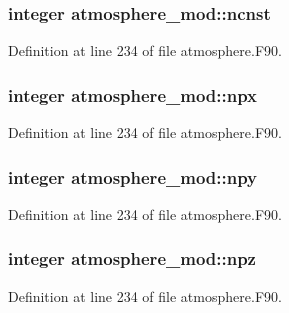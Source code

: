 \subsubsection[{ncnst}]{\setlength{\rightskip}{0pt plus 5cm}integer atmosphere\-\_\-mod\-::ncnst\hspace{0.3cm}{\ttfamily [private]}}\label{classatmosphere__mod_a9a8c995d33f2c1869ae7d0b49d5e1002}


Definition at line 234 of file atmosphere.\-F90.

\subsubsection[{npx}]{\setlength{\rightskip}{0pt plus 5cm}integer atmosphere\-\_\-mod\-::npx\hspace{0.3cm}{\ttfamily [private]}}\label{classatmosphere__mod_aa26f13c1bf254400bc1d3c556bc4b2f7}


Definition at line 234 of file atmosphere.\-F90.

\subsubsection[{npy}]{\setlength{\rightskip}{0pt plus 5cm}integer atmosphere\-\_\-mod\-::npy\hspace{0.3cm}{\ttfamily [private]}}\label{classatmosphere__mod_aeef69bc0cde093c538645187edff87ff}


Definition at line 234 of file atmosphere.\-F90.

\subsubsection[{npz}]{\setlength{\rightskip}{0pt plus 5cm}integer atmosphere\-\_\-mod\-::npz\hspace{0.3cm}{\ttfamily [private]}}\label{classatmosphere__mod_a8db34afa5af2e9757555a6ce961b26e5}


Definition at line 234 of file atmosphere.\-F90.

